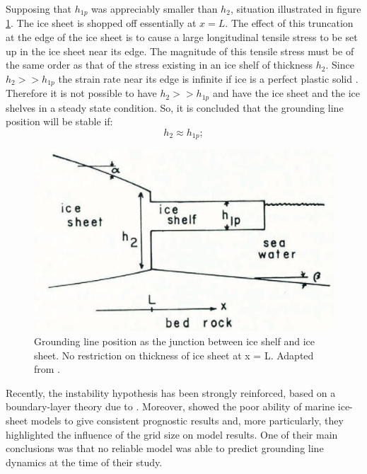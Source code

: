 \documentclass{article}
\begin{document}
Supposing that $h_{1p}$ was appreciably smaller than $h_2$, situation illustrated in figure \ref{Instability_condition}. The ice sheet is shopped off essentially at $x=L$. The effect of this truncation at the edge of the ice sheet is to cause a large longitudinal tensile stress to be set up in the ice sheet near its edge. The magnitude of this tensile stress must be of the same order as that of the stress existing in an ice shelf of thickness $h_2$. Since $h_2>>h_{1p}$ the strain rate near its edge is infinite if ice is a perfect plastic solid \cite[]{weertman1974stability}. Therefore it is not possible to have $h_2>>h_{1p}$ and have the ice sheet and the ice shelves in a steady state condition. So, it is concluded that the grounding line position will be stable if:
\begin{equation}
	h_2 \approx h_{1p};
\end{equation}

\begin{figure}[!h]
	\centering
	\includegraphics[width=0.7\linewidth]{../fig/H2.png}
	\caption{Grounding line position as the junction between ice shelf and ice sheet. No restriction on thickness of ice sheet at x = L. Adapted from \cite{weertman1974stability}.}
	\label{Instability_condition}
\end{figure}

Recently, the instability hypothesis has been strongly reinforced, based on a boundary-layer theory due to \cite{schoof2007ice}. Moreover, \cite{vieli2005assessing} showed the poor ability of marine ice-sheet models to give consistent prognostic results and, more particularly, they highlighted the influence of the grid size on model results. One of their main conclusions was that no reliable model was able to predict grounding line dynamics at the time of their study.
\end{document}
